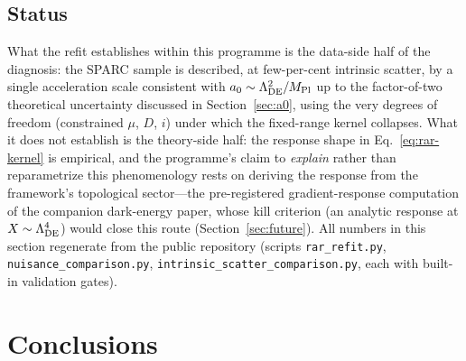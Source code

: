 \documentclass[11pt,a4paper]{article}
\begin{document}
\subsection{Status}

What the refit establishes within this programme is the
data-side half of the diagnosis: the SPARC sample is described,
at few-per-cent intrinsic scatter, by a single acceleration scale
consistent with $a_0 \sim \Lambda_{\rm DE}^2/M_{\rm Pl}$ up to the
factor-of-two theoretical uncertainty discussed in
Section~\ref{sec:a0}, using the very degrees of freedom
(constrained $\mu$, $D$, $i$) under which the fixed-range kernel
collapses.
What it does not establish is the theory-side half: the response
shape in Eq.~\eqref{eq:rar-kernel} is empirical, and the
programme's claim to \emph{explain} rather than reparametrize this
phenomenology rests on deriving the response from the framework's
topological sector---the pre-registered gradient-response
computation of the companion dark-energy paper, whose kill
criterion (an analytic response at $X \sim \Lambda_{\rm DE}^4$)
would close this route (Section~\ref{sec:future}).
All numbers in this section regenerate from the public repository
(scripts \texttt{rar\_refit.py}, \texttt{nuisance\_comparison.py},
\texttt{intrinsic\_scatter\_comparison.py}, each with built-in
validation gates).

\section{Conclusions}
\label{sec:conclusions}
\end{document}
